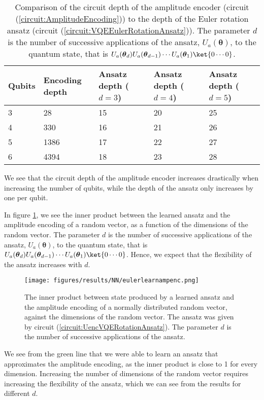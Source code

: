 \begin{table}[H]
\centering
\caption{Comparison of the circuit depth of the amplitude encoder (circuit (\ref{circuit:AmplitudeEncoding})) to the depth of the Euler rotation ansatz (circuit (\ref{circuit:VQEEulerRotationAnsatz})). The parameter $d$ is the number of successive applications of the ansatz, $U_a(\boldsymbol{\theta})$, to the quantum state, that is $U_a(\boldsymbol{\theta}_d)U_a(\boldsymbol{\theta}_{d-1})\cdots U_a(\boldsymbol{\theta}_1) \ket{0\cdots 0}$.}
\label{tab:AnsatzVsAmplitudeEncoding}
\begin{tabular}{|l|l|l|l|l|}
\hline
Qubits & Encoding depth & Ansatz depth ($d=3$) & Ansatz depth ($d=4$) & Ansatz depth ($d=5$) \\ \hline
3                & 28                       & 15                                & 20                                & 25                                \\ \hline
4                & 330                      & 16                                & 21                                & 26                                \\ \hline
5                & 1386                     & 17                                & 22                                & 27                                \\ \hline
6                & 4394                     & 18                                & 23                                & 28    \\ \hline                            
\end{tabular}
\end{table}
We see that the circuit depth of the amplitude encoder increases drastically when increasing the number of qubits, while the depth of the ansatz only increases by one per qubit.

In figure \ref{fig:nnAnsatzComparisonEuler}, we see the inner product between the learned ansatz and the amplitude encoding of a random vector, as a function of the dimensions of the random vector. The parameter $d$ is the number of successive applications of the ansatz, $U_a(\boldsymbol{\theta})$, to the quantum state, that is $U_a(\boldsymbol{\theta}_d)U_a(\boldsymbol{\theta}_{d-1})\cdots U_a(\boldsymbol{\theta}_1) \ket{0\cdots 0}$. Hence, we expect that the flexibility of the ansatz increases with $d$.

\begin{figure}[H]
    \centering
    \texttt{[image: figures/results/NN/eulerlearnampenc.png]}
    \caption{The inner product between state produced by a learned ansatz and the amplitude encoding of a normally distributed random vector, against the dimensions of the random vector. The ansatz was given by circuit (\ref{circuit:UencVQERotationAnsatz}). The parameter $d$ is the number of successive applications of the ansatz.}
    \label{fig:nnAnsatzComparisonEuler}
\end{figure}
We see from the green line that we were able to learn an ansatz that approximates the amplitude encoding, as the inner product is close to 1 for every dimension. Increasing the number of dimensions of the random vector requires increasing the flexibility of the ansatz, which we can see from the results for different $d$.

